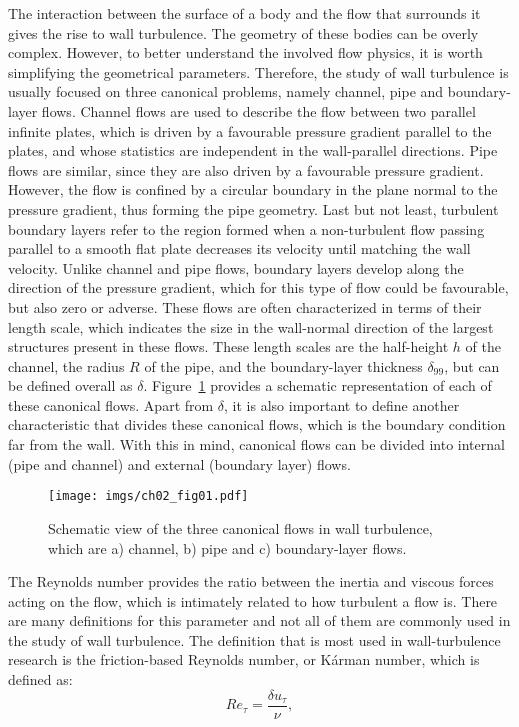 The interaction between the surface of a body and the flow that surrounds it gives the rise to wall turbulence.
The geometry of these bodies can be overly complex.
However, to better understand the involved flow physics, it is worth simplifying the geometrical parameters.
Therefore, the study of wall turbulence is usually focused on three canonical problems, namely channel, pipe and boundary-layer flows.
Channel flows are used to describe the flow between two parallel infinite plates, which is driven by a favourable pressure gradient parallel to the plates, and whose statistics are independent in the wall-parallel directions.
Pipe flows are similar, since they are also driven by a favourable pressure gradient.
However, the flow is confined by a circular boundary in the plane normal to the pressure gradient, thus forming the pipe geometry.
Last but not least, turbulent boundary layers refer to the region formed when a non-turbulent flow passing parallel to a smooth flat plate decreases its velocity until matching the wall velocity.
Unlike channel and pipe flows, boundary layers develop along the direction of the pressure gradient, which for this type of flow could be favourable, but also zero or adverse.
These flows are often characterized in terms of their length scale, which indicates the size in the wall-normal direction of the largest structures present in these flows.
These length scales are the half-height $h$ of the channel, the radius $R$ of the pipe, and the boundary-layer thickness $\delta_{99}$, but can be defined overall as $\delta$.
Figure~\ref{ch02:fig01} provides a schematic representation of each of these canonical flows.
Apart from $\delta$, it is also important to define another characteristic that divides these canonical flows, which is the boundary condition far from the wall.
With this in mind, canonical flows can be divided into internal (pipe and channel) and external (boundary layer) flows.

\begin{figure}
  \centering
  \texttt{[image: imgs/ch02\_fig01.pdf]}
  \caption{\label{ch02:fig01}Schematic view of the three canonical flows in wall turbulence, which are a) channel, b) pipe and c) boundary-layer flows.}
\end{figure}


The Reynolds number provides the ratio between the inertia and viscous forces acting on the flow, which is intimately related to how turbulent a flow is.
There are many definitions for this parameter and not all of them are commonly used in the study of wall turbulence.
The definition that is most used in wall-turbulence research is the friction-based Reynolds number, or Kárman number, which is defined as:
\begin{equation}
  Re_{\tau}=\frac{\delta u_{\tau}}{\nu},
  \label{ch02:eq01}
\end{equation}

